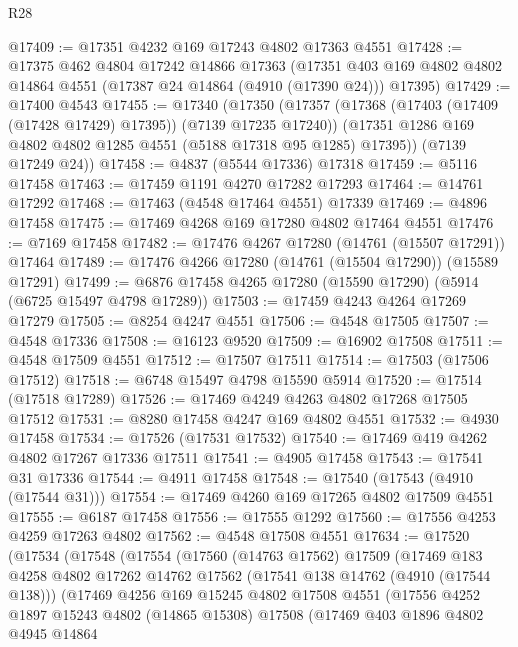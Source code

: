 \begin{lexlean}{R28}
\begin{coremodule}
@17409 := @17351 @4232 @169 @17243 @4802 @17363 @4551
@17428 := @17375
    @462
    @4804
    @17242
    @14866
    @17363
    (@17351 @403 @169 @4802 @4802 @14864 @4551 (@17387 @24 @14864 (@4910 (@17390 @24))) @17395)
@17429 := @17400 @4543
@17455 := @17340
    (@17350
      (@17357
        (@17368 (@17403 (@17409 (@17428 @17429) @17395)) (@7139 @17235 @17240))
        (@17351 @1286 @169 @4802 @4802 @1285 @4551 (@5188 @17318 @95 @1285) @17395))
      (@7139 @17249 @24))
@17458 := @4837 (@5544 @17336) @17318
@17459 := @5116 @17458
@17463 := @17459 @1191 @4270 @17282 @17293
@17464 := @14761 @17292
@17468 := @17463 (@4548 @17464 @4551) @17339
@17469 := @4896 @17458
@17475 := @17469 @4268 @169 @17280 @4802 @17464 @4551
@17476 := @7169 @17458
@17482 := @17476 @4267 @17280 (@14761 (@15507 @17291)) @17464
@17489 := @17476 @4266 @17280 (@14761 (@15504 @17290)) (@15589 @17291)
@17499 := @6876 @17458 @4265 @17280 (@15590 @17290) (@5914 (@6725 @15497 @4798 @17289))
@17503 := @17459 @4243 @4264 @17269 @17279
@17505 := @8254 @4247 @4551
@17506 := @4548 @17505
@17507 := @4548 @17336
@17508 := @16123 @9520
@17509 := @16902 @17508
@17511 := @4548 @17509 @4551
@17512 := @17507 @17511
@17514 := @17503 (@17506 @17512)
@17518 := @6748 @15497 @4798 @15590 @5914
@17520 := @17514 (@17518 @17289)
@17526 := @17469 @4249 @4263 @4802 @17268 @17505 @17512
@17531 := @8280 @17458 @4247 @169 @4802 @4551
@17532 := @4930 @17458
@17534 := @17526 (@17531 @17532)
@17540 := @17469 @419 @4262 @4802 @17267 @17336 @17511
@17541 := @4905 @17458
@17543 := @17541 @31 @17336
@17544 := @4911 @17458
@17548 := @17540 (@17543 (@4910 (@17544 @31)))
@17554 := @17469 @4260 @169 @17265 @4802 @17509 @4551
@17555 := @6187 @17458
@17556 := @17555 @1292
@17560 := @17556 @4253 @4259 @17263 @4802
@17562 := @4548 @17508 @4551
@17634 := @17520
    (@17534
      (@17548
        (@17554
          (@17560
            (@14763 @17562)
            @17509
            (@17469
              @183
              @4258
              @4802
              @17262
              @14762
              @17562
              (@17541 @138 @14762 (@4910 (@17544 @138)))
              (@17469
                @4256
                @169
                @15245
                @4802
                @17508
                @4551
                (@17556
                  @4252
                  @1897
                  @15243
                  @4802
                  (@14865 @15308)
                  @17508
                  (@17469
                    @403
                    @1896
                    @4802
                    @4945
                    @14864

\end{coremodule}
\end{lexlean}

